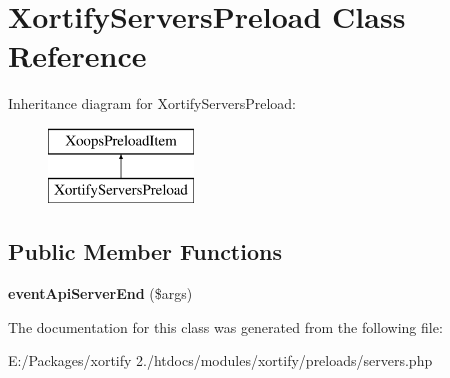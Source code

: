 \hypertarget{class_xortify_servers_preload}{\section{Xortify\-Servers\-Preload Class Reference}
\label{class_xortify_servers_preload}
}
Inheritance diagram for Xortify\-Servers\-Preload\-:\begin{figure}[H]
\begin{center}
\leavevmode
\includegraphics[height=2.000000cm]{class_xortify_servers_preload}
\end{center}
\end{figure}
\subsection*{Public Member Functions}
\begin{DoxyCompactItemize}
\item 
\hypertarget{class_xortify_servers_preload_a4419985b1d133a001b47833c48801279}{{\bfseries event\-Api\-Server\-End} (\$args)}\label{class_xortify_servers_preload_a4419985b1d133a001b47833c48801279}

\end{DoxyCompactItemize}


The documentation for this class was generated from the following file\-:\begin{DoxyCompactItemize}
\item 
E\-:/\-Packages/xortify 2./htdocs/modules/xortify/preloads/servers.\-php\end{DoxyCompactItemize}
